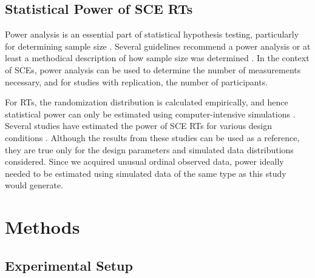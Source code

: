 \documentclass{article}
\begin{document}
\subsection{Statistical Power of SCE RTs }

Power analysis is an essential part of statistical hypothesis testing, particularly for determining sample size \parencite{Cohen1988}. Several guidelines recommend a power analysis or at least a methodical description of how sample size was determined \parencite{Vohra2015}\parencite{Willkinson1999}. In the context of SCEs, power analysis can be used to determine the number of measurements necessary, and for studies with replication, the number of participants.

For RTs, the randomization distribution is calculated empirically, and hence statistical power can only be estimated using computer-intensive simulations \parencite{Onghena1992}\parencite{Ferron1995}. Several studies have estimated the power of SCE RTs for various design conditions \parencite{Ferron1996}\parencite{Ferron1995}\parencite{Michiels2018}\parencite{Bouwmeester2020}\parencite{Ferron2002}\parencite{De2020}. Although the results from these studies can be used as a reference, they are true only for the design parameters and simulated data distributions considered. Since we acquired unusual ordinal observed data, power ideally needed to be estimated using simulated data of the same type as this study would generate.

\section{Methods}

\subsection{Experimental Setup}
\end{document}

